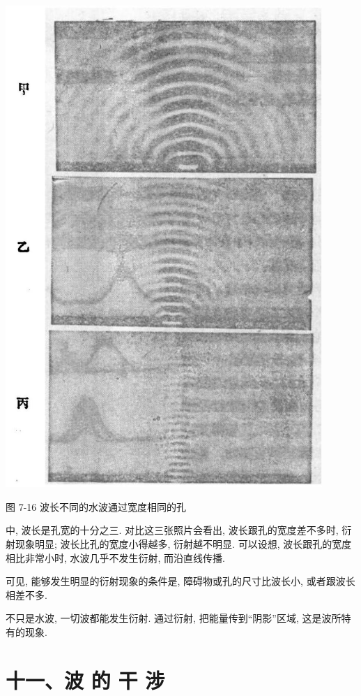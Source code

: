 \documentclass[10pt]{article}
\begin{document}
\begin{center}
\includegraphics[max width=0.9\textwidth]{images/01912d55-147c-70aa-b0e0-1782a122f948_212_946466.jpg}
\end{center}

图 7-16 波长不同的水波通过宽度相同的孔

中, 波长是孔宽的十分之三. 对比这三张照片会看出, 波长跟孔的宽度差不多时, 衍射现象明显; 波长比孔的宽度小得越多, 衍射越不明显. 可以设想, 波长跟孔的宽度相比非常小时, 水波几乎不发生衍射, 而沿直线传播.

可见, 能够发生明显的衍射现象的条件是, 障碍物或孔的尺寸比波长小, 或者跟波长相差不多.

不只是水波, 一切波都能发生衍射. 通过衍射, 把能量传到“阴影”区域, 这是波所特有的现象.

\section*{十一、波 的 干 涉}
\end{document}

